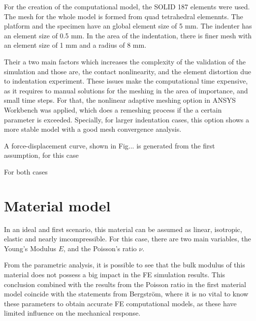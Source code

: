 For the creation of the computational model, the SOLID 187 elements were used. The mesh 
for the whole model is formed from quad tetrahedral elemennts. The platform and 
the specimen have an global element size of 5 mm. The indenter has an element size of
0.5 mm. In the area of the indentation, there is finer mesh with an element size of
1 mm and a radius of 8 mm. 

Their a two main factors which increases the complexity of the validation of the simulation
and those are, the contact nonlinearity, and the element distortion due to indentation
 experiment. These issues make the computational time expensive, as it requires to manual 
 solutions for the meshing in the area of importance, and small time steps. 
 For that, 
 the nonlinear adaptive meshing option in ANSYS Workbench was applied, which does a remeshing
 process if the a certain parameter is exceeded.%
Specially, for larger indentation cases, this option shows a more stable model with a 
good mesh convergence analysis.

A force-displacement curve, shown in Fig... is generated from the first assumption, 
for this case 

For both cases 
\section{Material model}

In an ideal and first scenario, this material can be assumed as linear, isotropic, 
elastic and nearly imcompressible. For this case, there are two main variables, the Young's
Modulus \(E\), and the Poisson's ratio $\nu$.

From the parametric analysis, it is possible to see that the bulk 
modulus of this material does not possess a big impact in the FE 
simulation results. This conclusion combined with the results 
from the Poisson ratio in the first material model coincide with the 
statements from Bergström, where it is no vital to know these parameters 
to obtain accurate FE computational models, as these have limited
influence on the mechanical response. \cite{Bergström2015} %


